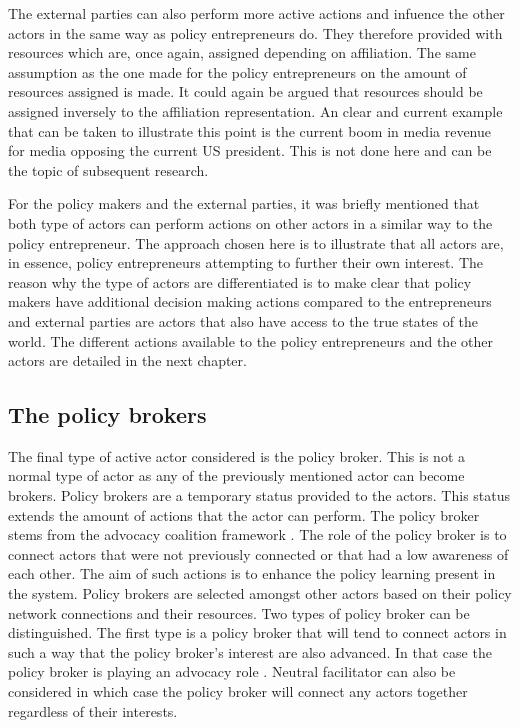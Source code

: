 The external parties can also perform more active actions and infuence the other actors in the same way as policy entrepreneurs do. They therefore provided with resources which are, once again, assigned depending on affiliation. The same assumption as the one made for the policy entrepreneurs on the amount of resources assigned is made. It could again be argued that resources should be assigned inversely to the affiliation representation. An clear and current example that can be taken to illustrate this point is the current boom in media revenue for media opposing the current US president. This is not done here and can be the topic of subsequent research.

For the policy makers and the external parties, it was briefly mentioned that both type of actors can perform actions on other actors in a similar way to the policy entrepreneur. The approach chosen here is to illustrate that all actors are, in essence, policy entrepreneurs attempting to further their own interest. The reason why the type of actors are differentiated is to make clear that policy makers have additional decision making actions compared to the entrepreneurs and external parties are actors that also have access to the true states of the world. The different actions available to the policy entrepreneurs and the other actors are detailed in the next chapter.

\subsection{The policy brokers}

The final type of active actor considered is the policy broker. This is not a normal type of actor as any of the previously mentioned actor can become brokers. Policy brokers are a temporary status provided to the actors. This status extends the amount of actions that the actor can perform. The policy broker stems from the advocacy coalition framework \citep{ingold2011treating, ingold2011network, jenkins2014advocacy, henry2011belief}. The role of the policy broker is to connect actors that were not previously connected or that had a low awareness of each other. The aim of such actions is to enhance the policy learning present in the system. Policy brokers are selected amongst other actors based on their policy network connections and their resources. Two types of policy broker can be distinguished. The first type is a policy broker that will tend to connect actors in such a way that the policy broker's interest are also advanced. In that case the policy broker is playing an advocacy role \citep{bardach1998getting}. Neutral facilitator can also be considered in which case the policy broker will connect any actors together regardless of their interests.

